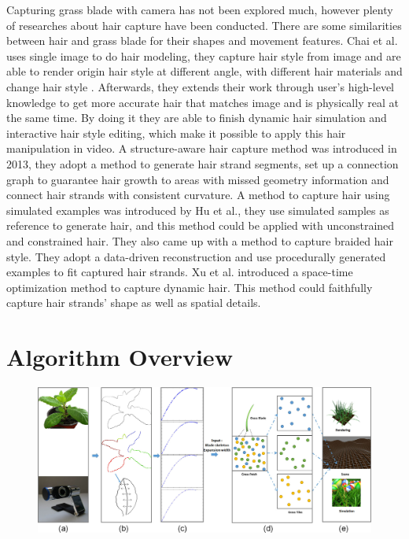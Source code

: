 \documentclass[10pt,journal,compsoc]{IEEEtran}
\begin{document}
Capturing grass blade with camera has not been explored much, however plenty of researches about hair capture have been conducted. There are some similarities between hair and grass blade for their shapes and movement features. Chai et al.\cite{chai2012single} uses single image to do hair modeling, they capture hair style from image and are able to render origin hair style at different angle, with different hair materials and change hair style . Afterwards, they extends their work through user's high-level knowledge to get more accurate hair that matches image and is physically real at the same time. By doing it they are able to finish dynamic hair simulation and interactive hair style editing, which make it possible to apply this hair manipulation in video\cite{chai2013dynamic}. A structure-aware hair capture method\cite{luo2013structure} was introduced in 2013, they adopt a method to generate hair strand segments, set up a connection graph to guarantee hair growth to areas with missed geometry information and connect hair strands with consistent curvature. A method to capture hair using simulated examples was introduced by Hu et al.\cite{hu2014robust}, they use simulated samples as reference to generate hair, and this method could be applied with unconstrained and constrained hair. They also came up with a method to capture braided hair style\cite{hu2014capturing}. They adopt a data-driven reconstruction and use procedurally generated examples to fit captured hair strands. Xu et al. introduced a space-time optimization method to capture dynamic hair. This method could faithfully capture hair strands' shape as well as spatial details.

\section{Algorithm Overview}


\begin{figure}
    \centering
    \includegraphics[width=1.0\textwidth]{figs/algorithm.jpg}
    \label{fig:overview}
\end{figure}
\end{document}
